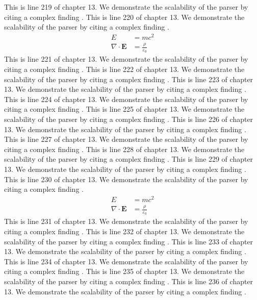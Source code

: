 This is line 219 of chapter 13. We demonstrate the scalability of the parser by citing a complex finding \cite{ref13_219}.
This is line 220 of chapter 13. We demonstrate the scalability of the parser by citing a complex finding \cite{ref13_220}.
\begin{align*}
  E &= mc^2 \\
  \nabla \cdot \mathbf{E} &= \frac{\rho}{\varepsilon_0}
\end{align*}
This is line 221 of chapter 13. We demonstrate the scalability of the parser by citing a complex finding \cite{ref13_221}.
This is line 222 of chapter 13. We demonstrate the scalability of the parser by citing a complex finding \cite{ref13_222}.
This is line 223 of chapter 13. We demonstrate the scalability of the parser by citing a complex finding \cite{ref13_223}.
This is line 224 of chapter 13. We demonstrate the scalability of the parser by citing a complex finding \cite{ref13_224}.
This is line 225 of chapter 13. We demonstrate the scalability of the parser by citing a complex finding \cite{ref13_225}.
This is line 226 of chapter 13. We demonstrate the scalability of the parser by citing a complex finding \cite{ref13_226}.
This is line 227 of chapter 13. We demonstrate the scalability of the parser by citing a complex finding \cite{ref13_227}.
This is line 228 of chapter 13. We demonstrate the scalability of the parser by citing a complex finding \cite{ref13_228}.
This is line 229 of chapter 13. We demonstrate the scalability of the parser by citing a complex finding \cite{ref13_229}.
This is line 230 of chapter 13. We demonstrate the scalability of the parser by citing a complex finding \cite{ref13_230}.
\begin{align*}
  E &= mc^2 \\
  \nabla \cdot \mathbf{E} &= \frac{\rho}{\varepsilon_0}
\end{align*}
This is line 231 of chapter 13. We demonstrate the scalability of the parser by citing a complex finding \cite{ref13_231}.
This is line 232 of chapter 13. We demonstrate the scalability of the parser by citing a complex finding \cite{ref13_232}.
This is line 233 of chapter 13. We demonstrate the scalability of the parser by citing a complex finding \cite{ref13_233}.
This is line 234 of chapter 13. We demonstrate the scalability of the parser by citing a complex finding \cite{ref13_234}.
This is line 235 of chapter 13. We demonstrate the scalability of the parser by citing a complex finding \cite{ref13_235}.
This is line 236 of chapter 13. We demonstrate the scalability of the parser by citing a complex finding \cite{ref13_236}.
